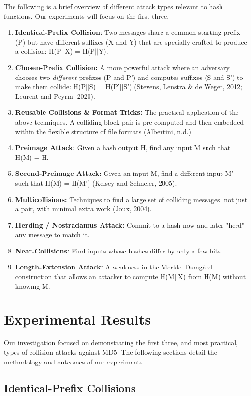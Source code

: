 \documentclass[runningheads]{llncs}
\begin{document}
    The following is a brief overview of different attack types relevant to hash functions. Our experiments will focus on the first three.
    \begin{enumerate}
        \item \textbf{Identical-Prefix Collision:} Two messages share a common starting prefix (P) but have different suffixes (X and Y) that are specially crafted to produce a collision: H(P$||$X) = H(P$||$Y).
        \item \textbf{Chosen-Prefix Collision:} A more powerful attack where an adversary chooses two \textit{different} prefixes (P and P') and computes suffixes (S and S') to make them collide: H(P$||$S) = H(P'$||$S') (Stevens, Lenstra \& de Weger, 2012; Leurent and Peyrin, 2020).
        \item \textbf{Reusable Collisions \& Format Tricks:} The practical application of the above techniques. A colliding block pair is pre-computed and then embedded within the flexible structure of file formats (Albertini, n.d.).
        \item \textbf{Preimage Attack:} Given a hash output H, find any input M such that H(M) = H.
        \item \textbf{Second-Preimage Attack:} Given an input M, find a different input M' such that H(M) = H(M') (Kelsey and Schneier, 2005).
        \item \textbf{Multicollisions:} Techniques to find a large set of colliding messages, not just a pair, with minimal extra work (Joux, 2004).
        \item \textbf{Herding / Nostradamus Attack:} Commit to a hash now and later "herd" any message to match it.
        \item \textbf{Near-Collisions:} Find inputs whose hashes differ by only a few bits.
        \item \textbf{Length-Extension Attack:} A weakness in the Merkle–Damgård construction that allows an attacker to compute H(M$||$X) from H(M) without knowing M.
    \end{enumerate}

    \section{Experimental Results}
    Our investigation focused on demonstrating the first three, and most practical, types of collision attacks against MD5. The following sections detail the methodology and outcomes of our experiments.

    \subsection{Identical-Prefix Collisions}
\end{document}
